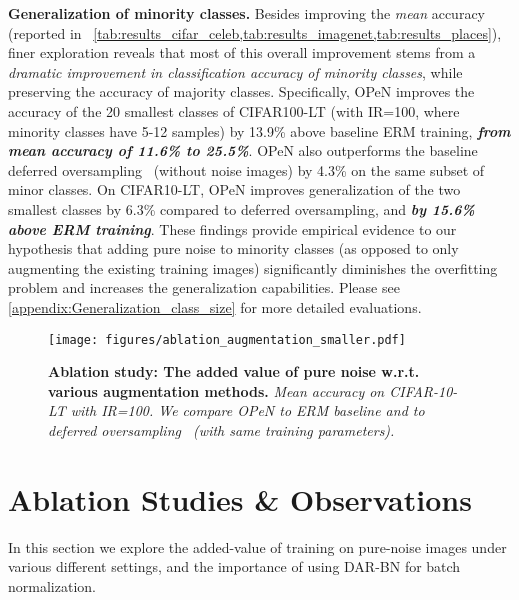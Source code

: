 \documentclass[nohyperref]{article}
\theoremstyle{plain}
\theoremstyle{definition}
\theoremstyle{remark}
\begin{document}
\noindent\textbf{Generalization of minority classes.}
Besides improving the \emph{mean} accuracy (reported in ~\cref{tab:results_cifar_celeb,tab:results_imagenet,tab:results_places}), finer exploration reveals that most of this overall improvement stems from a \emph{dramatic improvement in classification accuracy of minority classes}, while preserving the accuracy of majority classes. Specifically, OPeN improves the accuracy of the 20 smallest classes of {CIFAR100-LT} (with IR=100, where minority classes have 5-12 samples) by 13.9\% above baseline ERM training, \emph{\textbf{from mean accuracy of 11.6\% to 25.5\%}}.  OPeN also outperforms the baseline deferred oversampling~\cite{cao2019learning} (without noise images) by 4.3\% on the same subset of minor classes. On CIFAR10-LT, OPeN improves generalization of the two smallest classes by 6.3\% compared to deferred oversampling, and \emph{\textbf{by 15.6\% above ERM training}}. 
These findings provide empirical evidence to our hypothesis that adding pure noise to minority classes (as opposed to only augmenting the existing training images) significantly diminishes the overfitting problem and increases the generalization capabilities. Please see \cref{appendix:Generalization_class_size} for more detailed evaluations.

\begin{figure}[t]
\vspace*{-0.1cm}
	\centering
\texttt{[image: figures/ablation\_augmentation\_smaller.pdf]}
    \vspace{-0.9cm}
	\caption{\textbf{Ablation study: The added value of pure noise w.r.t. various augmentation methods.} {\it Mean accuracy on  CIFAR-10-LT  with IR=100. 
	We compare OPeN to ERM baseline and to deferred oversampling~\cite{cao2019learning} (with same training parameters).
	}}
	\label{fig:augmentation_ablation}
	\vspace*{-0.55cm}
\end{figure}

\vspace{-0.1cm}
\section{Ablation Studies \& Observations}
\label{sec:ablation_study_observations}
In this section we explore the added-value of training on pure-noise images under various different settings, and the importance of using DAR-BN for batch normalization.
\end{document}
